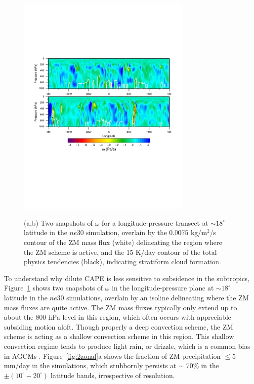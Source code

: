 \documentclass[times]{qjrms4}
\begin{document}
\begin{figure}
\begin{center}
\noindent\includegraphics[width=20pc,angle=0]{figs/temp_trans.pdf}\\
\end{center}
\caption{(a,b) Two snapshots of $\omega$ for a longitude-pressure transect at $\sim 18^{\circ}$ latitude in the $ne30$ simulation, overlain by the $0.0075$ kg/m$^2$/s contour of the ZM mass flux (white) delineating the region where the ZM scheme is active, and the 15 K/day contour of the total physics tendencies (black), indicating stratiform cloud formation.}
\label{fig:transect}
\end{figure}

To understand why dilute CAPE is less sensitive to subsidence in the subtropics, Figure~\ref{fig:transect} shows two snapshots of $\omega$ in the longitude-pressure plane at  $\sim 18^{\circ}$ latitude in the $ne30$ simulations, overlain by an isoline delineating where the ZM mass fluxes are quite active. The ZM mass fluxes typically only extend up to about the 800 hPa level in this region, which often occurs with appreciable subsiding motion aloft. Though properly a deep convection scheme, the ZM scheme is acting as a shallow convection scheme in this region. This shallow convection regime tends to produce light rain, or drizzle, which is a common bias in AGCMs \citep{D2006JCLIM}. Figure~\ref{fig:2zonal}a shows the fraction of ZM precipitation $\leq 5$ mm/day in the simulations, which stubbornly persists at $\sim$ 70\% in the $\pm \left(10^{\circ}-20^{\circ} \right)$ latitude bands, irrespective of resolution.
\end{document}
